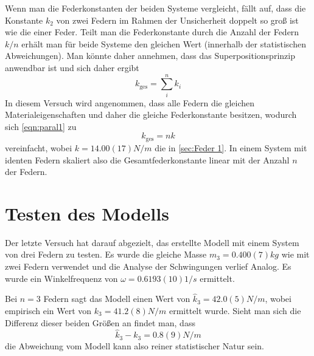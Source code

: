Wenn man die Federkonstanten der beiden Systeme vergleicht, fällt auf, dass die Konstante \( k_2 \) von zwei Federn im Rahmen der Unsicherheit doppelt so groß ist wie die einer Feder. Teilt man die Federkonstante durch die Anzahl der Federn \( k/n \) erhält man für beide Systeme den gleichen Wert (innerhalb der statistischen Abweichungen). Man könnte daher annehmen, dass das Superpositionsprinzip anwendbar ist und sich daher ergibt
\begin{equation}\label{eqn:paral1}
	k_{\text{ges}} = \sum_{i}^{n} k_i
\end{equation}
In diesem Versuch wird angenommen, dass alle Federn die gleichen Materialeigenschaften und daher die gleiche Federkonstante besitzen, wodurch sich \autoref{eqn:paral1} zu
\begin{equation}\label{eqn:paral2}
	k_{\text{ges}} = nk
\end{equation}
vereinfacht, wobei \( k = 14.00(17) \unit{N/m} \) die in \autoref{sec:Feder 1}. In einem System mit identen Federn skaliert also die Gesamtfederkonstante linear mit der Anzahl \( n \) der Federn.

\section{Testen des Modells}
Der letzte Versuch hat darauf abgezielt, das erstellte Modell mit einem System von drei Federn zu testen. Es wurde die gleiche Masse \( m_3 = 0.400(7) \unit{kg} \) wie mit zwei Federn verwendet und die Analyse der Schwingungen verlief Analog. Es wurde ein Winkelfrequenz von \( \omega = 0.6193(10) \unit{1/s} \) ermittelt.

Bei \( n = 3 \) Federn sagt das Modell einen Wert von \( \hat{k}_3 = 42.0(5) \unit{N/m} \), wobei empirisch ein Wert von \( k_3 = 41.2(8) \unit{N/m} \) ermittelt wurde. Sieht man sich die Differenz dieser beiden Größen an findet man, dass
\begin{equation}\label{eqn:diff}
	\hat{k}_3 - k_3 = 0.8(9) \unit{N/m}
\end{equation}
die Abweichung vom Modell kann also reiner statistischer Natur sein.






